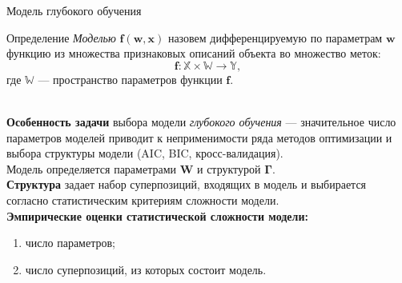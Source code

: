 \documentclass[usenames,dvipsnames,11pt,pdf,utf8,russian,aspectratio=43]{beamer}
\begin{document}
\begin{frame}{Модель глубокого обучения}
\small
\begin{block}{Определение}
\textit{Моделью} $\mathbf{f}(\mathbf{w}, \mathbf{x})$ назовем дифференцируемую по параметрам $\mathbf{w}$ функцию из множества признаковых описаний объекта во множество меток:
\[
    \mathbf{f}: \mathbb{X} \times \mathbb{W} \to \mathbb{Y},
\] 
где $\mathbb{W}$ --- пространство параметров функции $\mathbf{f}$.
\end{block}
~\\
\textbf{Особенность задачи}  выбора модели \textit{глубокого обучения} --- значительное число параметров моделей приводит к неприменимости ряда методов оптимизации и выбора структуры модели  (AIC, BIC, кросс-валидация). \\

Модель определяется параметрами $\mathbf{W}$ и структурой $\boldsymbol{\Gamma}$.\\
\textbf{Структура} задает набор суперпозиций, входящих в модель и выбирается согласно статистическим критериям сложности модели.\\

\textbf{Эмпирические оценки статистической сложности модели:}
\begin{enumerate}
\item число параметров;
\item число суперпозиций, из которых состоит модель.
\end{enumerate}
\end{frame}
\end{document}
